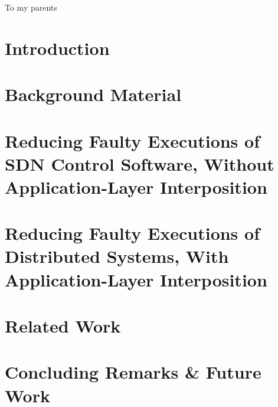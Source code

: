 

\begin{abstract}

\end{abstract}

\begin{frontmatter}

\begin{dedication}
\null\vfil
{\large
\begin{center}
To my parents
\end{center}}
\null\vfil
\end{dedication}

\tableofcontents
\listoffigures %
\listoftables %

\makeatletter
\let\@currsize\normalsize
\makeatother
{}
\setlength{\parskip}{.25\baselineskip}%

%

\end{frontmatter}

\makeatletter
\let\@currsize\normalsize
\makeatother
{}
\setlength{\parskip}{.25\baselineskip}%

\chapter{Introduction}
\label{sec:intro}


\chapter{Background Material}
\label{sec:background_material}


\chapter{Reducing Faulty Executions of SDN Control Software, Without Application-Layer Interposition}
\label{sec:sts}


\chapter{Reducing Faulty Executions of Distributed Systems, With Application-Layer Interposition}
\label{sec:demi}


\chapter{Related Work}
\label{sec:related_work}


\chapter{Concluding Remarks \& Future Work}
\label{main_sec:conclusion}


%

%


\printbibliography


